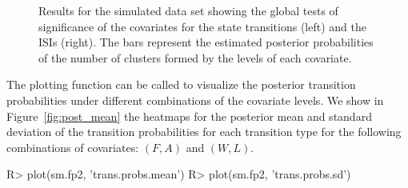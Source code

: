\begin{figure}[!ht]
\centering
{}
\qquad
{}
\caption{Results for the simulated  data set showing the global tests of significance of the covariates for the state transitions (left) and the ISIs (right).
The bars represent the estimated posterior probabilities of the number of clusters formed by the levels of each covariate.}
\label{fig:global}
\end{figure}

The plotting function can be called to visualize the posterior transition probabilities under different combinations of the covariate levels. 
We show in Figure~\ref{fig:post_mean} the heatmaps for the posterior mean and standard deviation of the transition probabilities for each transition type for the following combinations of covariates: $(F,A)$ and $(W,L)$.

\begin{example}
R> plot(sm.fp2, 'trans.probs.mean')
R> plot(sm.fp2, 'trans.probs.sd')
\end{example}

